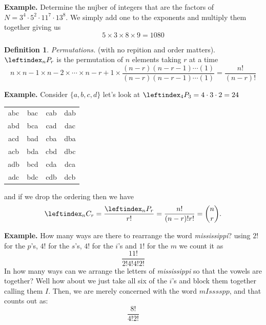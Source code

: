\documentclass[12pt]{amsart}
\theoremstyle{definition}
\newtheorem{definition}{Definition}
\begin{document}
\begin{onehalfspace}
        \noindent\textbf{Example.} Determine the nujber of integers that are the factors of $N = 3^4 \cdot 5^2 \cdot 11^7 \cdot 13^8$.
        We simply add one to the exponents and multiply them together giving us
        \begin{displaymath}
            5 \times 3 \times 8 \times 9  = 1080
        \end{displaymath}

        \begin{definition}
            \emph{Permutations.} (with no repition and order matters). \\
            $\leftindex_n P_r$ is the permutation of $n$ elements taking $r$ at a time
            \begin{displaymath}
                n \times n-1 \times n-2 \times \cdots \times n-r + 1 \times \frac{(n-r)(n-r-1)\cdots (1)}{(n-r)(n-r-1)\cdots(1)} = \frac{n!}{(n-r)!}
            \end{displaymath}
        \end{definition}

        \noindent\textbf{Example.} Consider $\{a,b,c,d\}$ let's look at $\leftindex_4 P_3 = 4 \cdot 3 \cdot 2 = 24$
        \begin{center}
            \begin{tabular}{ c|c|c|c }
                abc & bac & cab & dab \\
                abd & bca & cad & dac \\
                acd & bad & cba & dba \\
                acb & bda & cbd & dbc \\
                adb & bcd & cda & dca \\
                adc & bdc & cdb & dcb
            \end{tabular}
        \end{center}
        and if we drop the ordering then we have
        \begin{displaymath}
            \leftindex_n C_r = \frac{\leftindex_n P_r}{r!} = \frac{n!}{(n-r)!r!} = \binom{n}{r}.
        \end{displaymath}

        \noindent\textbf{Example.} How many ways are there to rearrange the word \emph{mississippi}?
        using $2!$ for the $p$'s, $4!$ for the $s$'s, $4!$ for the $i$'s and $1!$ for the $m$ we count it as
        \begin{displaymath}
            \frac{11!}{2!4!4!2!}
        \end{displaymath}
        In how many ways can we arrange the letters of \emph{mississippi} so that the vowels are together? Well how about
        we just take all six of the $i$'s and block them together calling them $I$. Then, we are merely concerned with
        the word $mIsssspp$, and that counts out as:
        \begin{displaymath}
            \frac{8!}{4!2!}
        \end{displaymath}


\end{onehalfspace}
\end{document}
